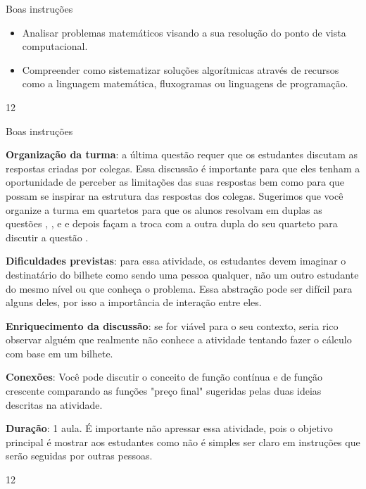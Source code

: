 \marginpar{\vspace{-2em}}
\begin{objectives}{Boas instruções}
{
\begin{itemize}
\item Analisar problemas matemáticos visando a sua resolução do ponto de vista computacional.

\item Compreender como sistematizar soluções algorítmicas através de recursos como a linguagem matemática, fluxogramas ou linguagens de programação.
\end{itemize}
}{1}{2}
\end{objectives}
\marginpar{\vspace{-2em}}
\begin{sugestions}{Boas instruções}
{
\textbf{Organização da turma}: a última questão requer que os estudantes discutam as respostas criadas por colegas. Essa discussão é importante para que eles tenham a oportunidade de perceber as limitações das suas respostas bem como para que possam se inspirar na estrutura das respostas dos colegas. Sugerimos que você organize a turma em quartetos para que os alunos resolvam em duplas as questões , ,  e  e depois façam a troca com a outra dupla do seu quarteto para discutir a questão .

\textbf{Dificuldades previstas}: para essa atividade, os estudantes devem imaginar o destinatário do bilhete como sendo uma pessoa qualquer, não um outro estudante do mesmo nível ou que conheça o problema. Essa abstração pode ser difícil para alguns deles, por isso a importância de interação entre eles.

\textbf{Enriquecimento da discussão}: se for viável para o seu contexto, seria rico observar alguém que realmente não conhece a atividade tentando fazer o cálculo com base em um bilhete.

\textbf{Conexões}: Você pode discutir o conceito de função contínua e de função crescente comparando as funções "preço final"{} sugeridas pelas duas ideias descritas na atividade.

\textbf{Duração}: 1 aula. É importante não apressar essa atividade, pois o objetivo principal é mostrar aos estudantes como não é simples ser claro em instruções que serão seguidas por outras pessoas.
}{1}{2}
\end{sugestions}
